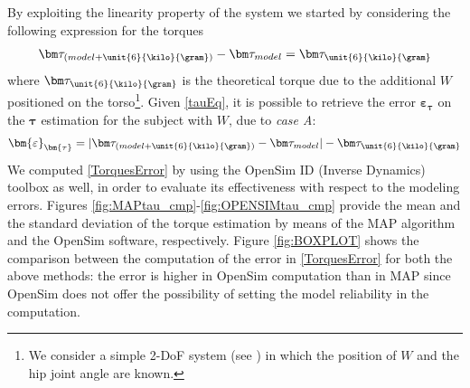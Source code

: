 %
By exploiting the linearity property of the system we started by considering the 
following expression for the torques
\begin{eqnarray} \label{tauEq}
	\bm \tau_{(model + \unit{6}{\kilo}{\gram})} - \bm \tau_{model} = 
	\bm \tau_{\unit{6}{\kilo}{\gram}}
\end{eqnarray} 
where $\bm \tau_{\unit{6}{\kilo}{\gram}}$ is the theoretical torque due to the additional $W$
positioned on the torso\footnote{We consider a simple 2-DoF system (see \cite{LatellaSensors2016}) in which the position of $W$ and the hip joint angle are known.}.  Given \eqref{tauEq}, 
 it is possible to retrieve the error $\bm{\varepsilon}_{\bm{\tau}}$ on the $\bm \tau$ 
  estimation for the subject with $W$, due to \emph{case A}:
\begin{eqnarray} \label{TorquesError}
	\bm{\varepsilon}_{\bm{\tau}} = |\bm \tau_{(model + \unit{6}{\kilo}{\gram})} -
	 \bm \tau_{model}| - \bm \tau_{\unit{6}{\kilo}{\gram}}
\end{eqnarray}
%
We computed \eqref{TorquesError} by using the OpenSim ID (Inverse Dynamics) toolbox 
as well, in order to evaluate its effectiveness with respect to the modeling errors.
Figures \ref{fig:MAPtau_cmp}-\ref{fig:OPENSIMtau_cmp} provide the mean and the standard deviation of the torque estimation by means of the MAP algorithm and the OpenSim software, respectively.  Figure \ref{fig:BOXPLOT} shows the comparison between the computation of the error in \eqref{TorquesError} for both the above methods: the error is higher in OpenSim computation than in MAP since OpenSim does not offer the possibility of setting the model reliability in the computation.
%
%
